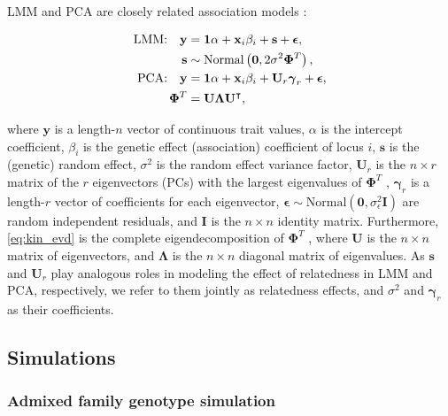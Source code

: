 \documentclass[11pt]{article}
\newcommand{\kinMat}[1][T]{%
  \ensuremath{%
    \mathbf{\Phi}^{#1}
  }%
  \xspace%
}%
\begin{document}
\begin{linenumbers}
LMM and PCA are closely related association models \citep{astle_population_2009, hoffman_correcting_2013, yao_limitations_2022}:
\begin{linenomath*}
\begin{align}
  \label{eq:lmm_gwas}
  \text{LMM:}\quad
  \mathbf{y}
  &=
    \mathbf{1} \alpha + \mathbf{x}_i \beta_i + \mathbf{s} + \boldsymbol{\epsilon}
    , \\
  \label{eq:lmm_rand_eff}
  \mathbf{s}
  &\sim
    \text{Normal} \left( \mathbf{0}, 2 \sigma^2 \kinMat \right), \\
  \label{eq:pca_gwas}
  \text{PCA:}\quad
  \mathbf{y}
  &=
    \mathbf{1} \alpha + \mathbf{x}_i \beta_i + \mathbf{U}_r \boldsymbol{\gamma}_r + \boldsymbol{\epsilon}
    , \\
  \label{eq:kin_evd}
  \kinMat
  &=
    \mathbf{U} \mathbf{\Lambda} \mathbf{U}^\intercal
    ,
\end{align}
\end{linenomath*}
where
$\mathbf{y}$ is a length-$n$ vector of continuous trait values,
$\alpha$ is the intercept coefficient,
$\beta_i$ is the genetic effect (association) coefficient of locus $i$,
$\mathbf{s}$ is the (genetic) random effect,
$\sigma^2$ is the random effect variance factor,
$\mathbf{U}_r$ is the $n \times r$ matrix of the $r$ eigenvectors (PCs) with the largest eigenvalues of \kinMat,
$\boldsymbol{\gamma}_r$ is a length-$r$ vector of coefficients for each eigenvector,
$\boldsymbol{\epsilon} \sim \text{Normal}(\mathbf{0}, \sigma^2_\epsilon \mathbf{I})$ are random independent residuals,
and $\mathbf{I}$ is the $n \times n$ identity matrix.
Furthermore, \cref{eq:kin_evd} is the complete eigendecomposition of \kinMat,
where $\mathbf{U}$ is the $n \times n$ matrix of eigenvectors, and
$\mathbf{\Lambda}$ is the $n \times n$ diagonal matrix of eigenvalues.
As $\mathbf{s}$ and $\mathbf{U}_r$ play analogous roles in modeling the effect of relatedness in LMM and PCA, respectively, we refer to them jointly as relatedness effects, and $\sigma^2$ and $\boldsymbol{\gamma}_r$ as their coefficients.

\subsection{Simulations}

\subsubsection{Admixed family genotype simulation}


\end{linenumbers}
\end{document}
